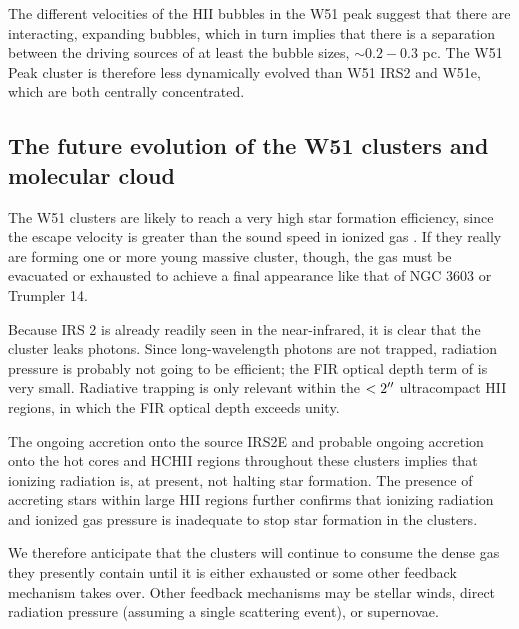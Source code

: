 The different velocities of the HII bubbles in the W51 peak suggest that there
are interacting, expanding bubbles, which in turn implies that there is a separation
between the driving sources of at least the bubble sizes, $\sim0.2-0.3$ pc.  
The W51 Peak cluster is therefore less dynamically evolved than W51 IRS2 and W51e,
which are both centrally concentrated.


\subsection{The future evolution of the W51 clusters and molecular cloud}
The W51 clusters are likely to reach a very high star formation efficiency,
since the escape velocity is greater than the sound speed in ionized gas
\citep{Ginsburg2012a,Bressert2012a}.  If they really are forming one or more
young massive cluster, though, the gas must be evacuated or exhausted to 
achieve a final appearance like that of NGC 3603 or Trumpler 14.

Because IRS 2 is already readily seen in the near-infrared, it is clear that
the cluster leaks photons.  Since long-wavelength photons are not trapped,
radiation pressure is probably not going to be efficient; the FIR optical depth
term of \citet{Murray2010a} is very small.  Radiative trapping is only
relevant within the $<2\mbox{$^{\prime\prime}$}$ ultracompact HII regions, in which the FIR optical
depth exceeds unity.

The ongoing accretion onto the source IRS2E and probable ongoing accretion onto
the hot cores and HCHII regions throughout these clusters implies that ionizing
radiation is, at present, not halting star formation.  The presence of
accreting stars within large HII regions further confirms that ionizing
radiation and ionized gas pressure is inadequate to stop star formation in the
clusters.

We therefore anticipate that the clusters will continue to consume the dense
gas they presently contain until it is either exhausted or some other feedback
mechanism takes over.  Other feedback mechanisms may be stellar winds, direct
radiation pressure (assuming a single scattering event),  or supernovae.

